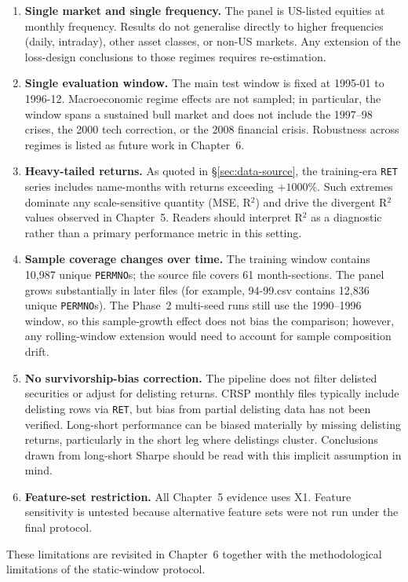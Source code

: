\begin{enumerate}
 \item \textbf{Single market and single frequency.} The panel is US-listed equities at monthly frequency. Results do not generalise directly to higher frequencies (daily, intraday), other asset classes, or non-US markets. Any extension of the loss-design conclusions to those regimes requires re-estimation.
 \item \textbf{Single evaluation window.} The main test window is fixed at 1995-01 to 1996-12. Macroeconomic regime effects are not sampled; in particular, the window spans a sustained bull market and does not include the 1997--98 crises, the 2000 tech correction, or the 2008 financial crisis. Robustness across regimes is listed as future work in Chapter~6.
 \item \textbf{Heavy-tailed returns.} As quoted in \S\ref{sec:data-source}, the training-era \texttt{RET} series includes name-months with returns exceeding $+1000\%$. Such extremes dominate any scale-sensitive quantity (MSE, R$^{2}$) and drive the divergent R$^{2}$ values observed in Chapter~5. Readers should interpret R$^{2}$ as a diagnostic rather than a primary performance metric in this setting.
 \item \textbf{Sample coverage changes over time.} The training window contains 10,987 unique \texttt{PERMNO}s; the source file covers 61 month-sections. The panel grows substantially in later files (for example, 94-99.csv contains 12,836 unique \texttt{PERMNO}s). The Phase~2 multi-seed runs still use the 1990--1996 window, so this sample-growth effect does not bias the comparison; however, any rolling-window extension would need to account for sample composition drift.
 \item \textbf{No survivorship-bias correction.} The pipeline does not filter delisted securities or adjust for delisting returns. CRSP monthly files typically include delisting rows via \texttt{RET}, but bias from partial delisting data has not been verified. Long-short performance can be biased materially by missing delisting returns, particularly in the short leg where delistings cluster. Conclusions drawn from long-short Sharpe should be read with this implicit assumption in mind.
 \item \textbf{Feature-set restriction.} All Chapter~5 evidence uses X1. Feature sensitivity is untested because alternative feature sets were not run under the final protocol.
\end{enumerate}

These limitations are revisited in Chapter~6 together with the methodological limitations of the static-window protocol.
